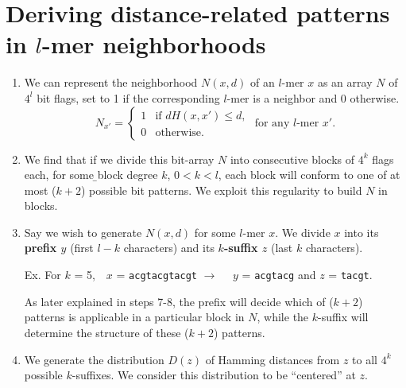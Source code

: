 \documentclass[oneside,12pt]{DISCSthesis}
\begin{document}
{	\section{\boldmath Deriving distance-related patterns in $l$-mer neighborhoods}
		\begin{enumerate}
			\item We can represent the neighborhood $N(x,d)$ of an $l$-mer $x$ as an array $N$ of $4^{l}$ bit flags, set to 1 if the corresponding $l$-mer is a neighbor and 0 otherwise.
				\begin{equation}
					N_{x'} = \left\{
					\begin{array}{rl}
						1 & \text{if } dH(x,x') \leq d,\\
						0 & \text{otherwise.}%
					\end{array} \right.
					\text{ for any $l$-mer }x'.
					\end{equation}

			\item We find that if we divide this bit-array $N$ into consecutive blocks of $4^{k}$ flags each, for some {\b\boldmath block degree $k$}, $0 < k < l$, each block will conform to one of at most ($k + 2$) possible bit patterns. We exploit this regularity to build $N$ in blocks.

			\item Say we wish to generate $N(x,d)$ for some $l$-mer $x$. We divide $x$ into its {\bf\boldmath prefix $y$ }(first $l - k$ characters) and its {\bf\boldmath $k$-suffix $z$} (last $k$ characters).

				{\small\hspace*{40pt}Ex. For $k$ = 5,\ \ $x$ = \texttt{acgtacgtacgt} $\rightarrow$ \ \ $y$ = \texttt{acgtacg} and $z$ = \texttt{tacgt}.}

			As later explained in steps 7-8, the prefix will decide which of ($k + 2$) patterns is applicable in a particular block in $N$, while the $k$-suffix will determine the structure of these ($k + 2$) patterns.

			\item We generate the distribution $D(z)$ of Hamming distances from $z$ to all $4^{k}$ possible $k$-suffixes. We consider this distribution to be ``centered'' at $z$.


\end{enumerate}}
\end{document}
